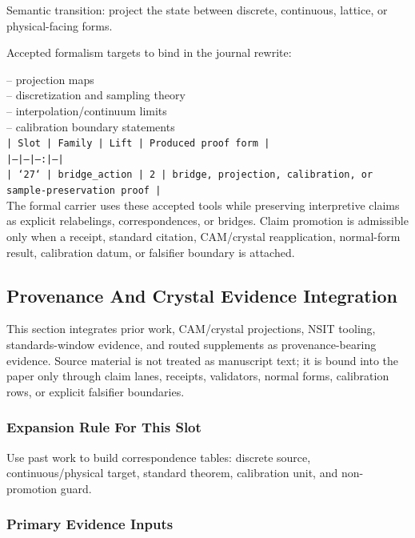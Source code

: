 \documentclass[11pt]{article}
\begin{document}
Semantic transition: project the state between discrete, continuous, lattice, or physical-facing forms.

Accepted formalism targets to bind in the journal rewrite:

\noindent{}-- projection maps\\
\noindent{}-- discretization and sampling theory\\
\noindent{}-- interpolation/continuum limits\\
\noindent{}-- calibration boundary statements\\

\noindent\texttt{| Slot | Family | Lift | Produced proof form |}\\
\noindent\texttt{|---|---|---:|---|}\\
\noindent\texttt{| `27` | bridge\_action | 2 | bridge, projection, calibration, or sample-preservation proof |}\\

The formal carrier uses these accepted tools while preserving interpretive
claims as explicit relabelings, correspondences, or bridges. Claim promotion is admissible only when a receipt, standard citation,
CAM/crystal reapplication, normal-form result, calibration datum, or falsifier
boundary is attached.

\subsection*{Provenance And Crystal Evidence Integration}

This section integrates prior work, CAM/crystal projections, NSIT tooling,
standards-window evidence, and routed supplements as provenance-bearing
evidence. Source material is not treated as manuscript text; it is bound into
the paper only through claim lanes, receipts, validators, normal forms,
calibration rows, or explicit falsifier boundaries.

\subsubsection*{Expansion Rule For This Slot}

Use past work to build correspondence tables: discrete source, continuous/physical target, standard theorem, calibration unit, and non-promotion guard.

\subsubsection*{Primary Evidence Inputs}
\end{document}
